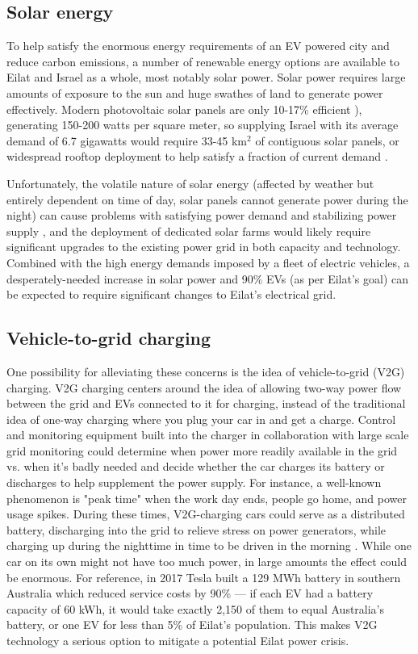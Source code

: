 \documentclass{report}                         %
\begin{document}
\subsection{Solar energy}
To help satisfy the enormous energy requirements of an EV powered city and reduce carbon emissions, a number of renewable energy options are available to Eilat and Israel as a whole, most notably solar power. Solar power requires large amounts of exposure to the sun and huge swathes of land to generate power effectively. Modern photovoltaic solar panels are only 10-17\% efficient \cite{Zhu2015DistributedGrid}), generating 150-200 watts per square meter, so supplying Israel with its average demand of 6.7 gigawatts would require 33-45 km$^2$ of contiguous solar panels, or widespread rooftop deployment to help satisfy a fraction of current demand \cite{Vardimon2011AssessmentIsrael}.

Unfortunately, the volatile nature of solar energy (affected by weather but entirely dependent on time of day, solar panels cannot generate power during the night) can cause problems with satisfying power demand and stabilizing power supply \cite{Lu2015IntroductionPEVs}, and the deployment of dedicated solar farms would likely require significant upgrades to the existing power grid \cite{Vardimon2011AssessmentIsrael} in both capacity and technology. Combined with the high energy demands imposed by a fleet of electric vehicles, a desperately-needed increase in solar power and 90\% EVs (as per Eilat's goal) can be expected to require significant changes to Eilat's electrical grid.

\subsection{Vehicle-to-grid charging}
One possibility for alleviating these concerns is the idea of vehicle-to-grid (V2G) charging. V2G charging centers around the idea of allowing two-way power flow between the grid and EVs connected to it for charging, instead of the traditional idea of one-way charging where you plug your car in and get a charge. Control and monitoring equipment built into the charger in collaboration with large scale grid monitoring could determine when power more readily available in the grid vs. when it's badly needed and decide whether the car charges its battery or discharges to help supplement the power supply. For instance, a well-known phenomenon is "peak time" when the work day ends, people go home, and power usage spikes. During these times, V2G-charging cars could serve as a distributed battery, discharging into the grid to relieve stress on power generators, while charging up during the nighttime in time to be driven in the morning \cite{Mahmud2015PowerEV}. While one car on its own might not have too much power, in large amounts the effect could be enormous. For reference, in 2017 Tesla built a 129 MWh battery in southern Australia which reduced service costs by 90\% \cite{Lambert2018Teslas90} --- if each EV had a battery capacity of 60 kWh, it would take exactly 2,150 of them to equal Australia's battery, or one EV for less than 5\% of Eilat's population. This makes V2G technology a serious option to mitigate a potential Eilat power crisis.
\end{document}
